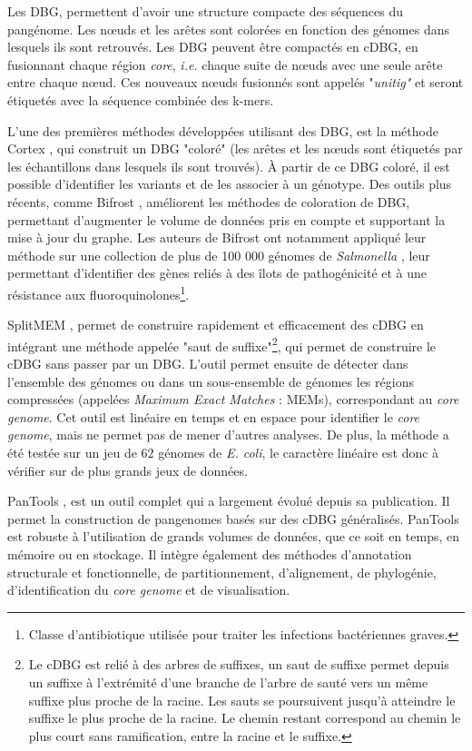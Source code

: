 Les DBG, permettent d'avoir une structure compacte des séquences du pangénome. Les n\oe uds et les arêtes sont colorées en fonction des génomes dans lesquels ils sont retrouvés. Les DBG peuvent être compactés en cDBG, en fusionnant chaque région \textit{core}, \textit{i.e.} chaque suite de n\oe uds avec une seule arête entre chaque n\oe ud. Ces nouveaux n\oe uds fusionnés sont appelés "\textit{unitig"} et seront étiquetés avec la séquence combinée des k-mers.

L'une des premières méthodes développées utilisant des DBG, est la méthode Cortex \cite{iqbal_novo_2012}, qui construit un DBG "coloré" (les arêtes et les n\oe uds sont étiquetés par les échantillons dans lesquels ils sont trouvés). À partir de ce DBG coloré, il est possible d'identifier les variants et de les associer à un génotype. Des outils plus récents, comme Bifrost \cite{holley_bifrost_2020}, améliorent les méthodes de coloration de DBG, permettant d'augmenter le volume de données pris en compte et supportant la mise à jour du graphe. Les auteurs de Bifrost ont notamment appliqué leur méthode sur une collection de plus de 100 000 génomes de \textit{Salmonella} \cite{luhmann_blastfrost_2021}, leur permettant d'identifier des gènes reliés à des îlots de pathogénicité et à une résistance aux fluoroquinolones\footnote{Classe d'antibiotique utilisée pour traiter les infections bactériennes graves.}.

\newpage
SplitMEM \cite{marcus_splitmem_2014}, permet de construire rapidement et efficacement des cDBG en intégrant une méthode appelée "saut de suffixe"\footnote{Le cDBG est relié à des arbres de suffixes, un saut de suffixe permet depuis un suffixe à l'extrémité d'une branche de l'arbre de sauté vers un même suffixe plus proche de la racine. Les sauts se poursuivent jusqu'à atteindre le suffixe le plus proche de la racine. Le chemin restant correspond au chemin le plus court sans ramification, entre la racine et le suffixe.}, qui permet de construire le cDBG sans passer par un DBG. L'outil permet ensuite de détecter dans l'ensemble des génomes ou dans un sous-ensemble de génomes les régions compressées (appelées \textit{Maximum Exact Matches} : MEMs), correspondant au \textit{core genome}. Cet outil est linéaire en temps et en espace pour identifier le \textit{core genome}, mais ne permet pas de mener d'autres analyses. De plus, la méthode a été testée sur un jeu de 62 génomes de \textit{E. coli}, le caractère linéaire est donc à vérifier sur de plus grands jeux de données.

PanTools \cite{sheikhizadeh_pantools_2016}, est un outil complet qui a largement évolué depuis sa publication. Il permet la construction de pangenomes basés sur des cDBG généralisés. PanTools est robuste à l'utilisation de grands volumes de données, que ce soit en temps, en mémoire ou en stockage. Il intègre également des méthodes d'annotation structurale et fonctionnelle, de partitionnement, d'alignement, de phylogénie, d'identification du \textit{core genome} et de visualisation. 

